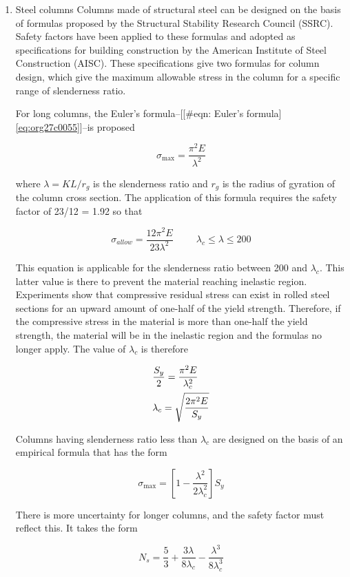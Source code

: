 \documentclass[a4paper,openany,12pt]{book}
\begin{document}
{{\begin{enumerate}
\item Steel columns
\label{sec:orgc5f0deb}
Columns made of structural steel can be designed on the basis of
formulas proposed by the Structural Stability Research Council (SSRC).
Safety factors have been applied to these formulas and adopted as
specifications for building construction by the American Institute of
Steel Construction (AISC). These specifications give two formulas for
column design, which give the maximum allowable stress in the column for
a specific range of slenderness ratio.

For long columns, the Euler's
formula--[[\#eqn: Euler's formula]\ref{eq:org27c0055}]--is proposed

$$\sigma_{\max} = \frac{\pi^2E}{\lambda^2}$$

where \(\lambda = KL/r_g\) is the slenderness ratio and \(r_g\) is the
radius of gyration of the column cross section. The application of this
formula requires the safety factor of 23/12 = 1.92 so that

$$\sigma_{allow} = \frac{12\pi^2E}{23\lambda^2} \hspace{1cm} \lambda_c \leqslant \lambda \leqslant 200$$

This equation is applicable for the slenderness ratio between 200 and
\(\lambda_c\). This latter value is there to prevent the material reaching
inelastic region. Experiments show that compressive residual stress can
exist in rolled steel sections for an upward amount of one-half of the
yield strength. Therefore, if the compressive stress in the material is
more than one-half the yield strength, the material will be in the
inelastic region and the formulas no longer apply. The value of
\(\lambda_c\) is therefore

$$\begin{gathered}
  \frac{S_y}{2} = \frac{\pi ^2E}{\lambda_c^2} \hfill \\
  \lambda_c = \sqrt {\frac{2\pi^2E}{S_y}}  \hfill \end{gathered}$$

Columns having slenderness ratio less than \(\lambda_c\) are designed on
the basis of an empirical formula that has the form

$$\sigma _{\max} = \left[ 1 - \frac{\lambda^2}{2\lambda_c^2} \right]S_y$$

There is more uncertainty for longer columns, and the safety factor must
reflect this. It takes the form

$$N_s = \frac{5}{3} + \frac{3\lambda}{8\lambda_c} - \frac{\lambda^3}{8\lambda_c^3}$$


\end{enumerate}}}
\end{document}
